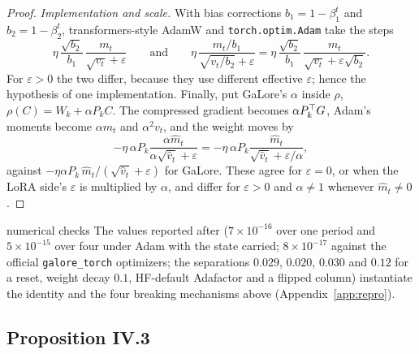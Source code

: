 \begin{proof}
\emph{Implementation and scale.} With bias corrections $b_1=1-\beta_1^t$ and $b_2=1-\beta_2^t$, transformers-style AdamW
and \texttt{torch.optim.Adam} take the steps
\[\eta\,\frac{\sqrt{b_2}}{b_1}\,\frac{m_t}{\sqrt{v_t}+\varepsilon}\qquad\text{and}\qquad
\eta\,\frac{m_t/b_1}{\sqrt{v_t/b_2}+\varepsilon}=\eta\,\frac{\sqrt{b_2}}{b_1}\,\frac{m_t}{\sqrt{v_t}+\varepsilon\sqrt{b_2}} .\]
For $\varepsilon>0$ the two differ, because they use different effective $\varepsilon$; hence the hypothesis of one
implementation. Finally, put GaLore's $\alpha$ inside $\rho$, $\rho(C)=W_k+\alpha P_kC$. The compressed gradient becomes
$\alpha P_k^{\top} G$, Adam's moments become $\alpha m_t$ and $\alpha^2v_t$, and the weight moves by
\[-\eta\,\alpha P_k\frac{\alpha\hat m_t}{\alpha\sqrt{\hat v_t}+\varepsilon}=-\eta\,\alpha P_k\frac{\hat m_t}{\sqrt{\hat v_t}+\varepsilon/\alpha},\]
against $-\eta\alpha P_k\,\hat m_t/(\sqrt{\hat v_t}+\varepsilon)$ for GaLore. These agree for $\varepsilon=0$, or when the LoRA
side's $\varepsilon$ is multiplied by $\alpha$, and differ for $\varepsilon>0$ and $\alpha\ne1$ whenever $\hat m_t\ne0$.
\end{proof}

\begin{remark*}{numerical checks}
The values reported after  ($7\times10^{-16}$ over one period and $5\times10^{-15}$ over four
under Adam with the state carried; $8\times10^{-17}$ against the official \texttt{galore\_torch} optimizers; the
separations $0.029$, $0.020$, $0.030$ and $0.12$ for a reset, weight decay $0.1$, HF-default Adafactor and a flipped
column) instantiate the identity and the four breaking mechanisms above (Appendix~\ref{app:repro}).
\end{remark*}

\subsection{Proposition IV.3}\label{proof:IV.3}

